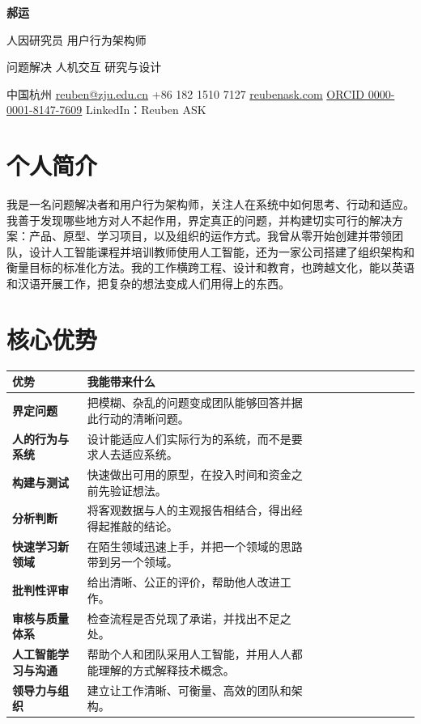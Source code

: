 \documentclass[10pt]{article}
\newcommand{\hd}[1]{\color{white}\bfseries #1}
\newcommand{\rowsep}{\\[3pt] \hline}
\newcommand{\dt}{\textperiodcentered{}}
\begin{document}
{\fontsize{25}{29}\selectfont\bfseries\color{navy} 郝运}\par\vspace{4pt}
{\fontsize{11}{14}\selectfont 人因研究员 \dt{} 用户行为架构师}\par\vspace{3pt}
问题解决 \dt{} 人机交互 \dt{} 研究与设计

中国杭州 \dt{} \href{mailto:reuben@zju.edu.cn}{reuben@zju.edu.cn} \dt{} +86 182 1510 7127\newline
\href{https://reubenask.com}{reubenask.com} \dt{} \href{https://orcid.org/0000-0001-8147-7609}{ORCID 0000-0001-8147-7609} \dt{} LinkedIn：Reuben ASK

\section*{个人简介}
我是一名问题解决者和用户行为架构师，关注人在系统中如何思考、行动和适应。我善于发现哪些地方对人不起作用，界定真正的问题，并构建切实可行的解决方案：产品、原型、学习项目，以及组织的运作方式。我曾从零开始创建并带领团队，设计人工智能课程并培训教师使用人工智能，还为一家公司搭建了组织架构和衡量目标的标准化方法。我的工作横跨工程、设计和教育，也跨越文化，能以英语和汉语开展工作，把复杂的想法变成人们用得上的东西。

\section*{核心优势}
{\fontsize{9.5}{11.5}\selectfont
\begin{longtable}{|P{41mm}|P{132.6mm}|}
\hline{} \hd{优势} & \hd{我能带来什么} \rowsep
{} \textbf{界定问题} & 把模糊、杂乱的问题变成团队能够回答并据此行动的清晰问题。 \rowsep
{} \textbf{人的行为与系统} & 设计能适应人们实际行为的系统，而不是要求人去适应系统。 \rowsep
{} \textbf{构建与测试} & 快速做出可用的原型，在投入时间和资金之前先验证想法。 \rowsep
{} \textbf{分析判断} & 将客观数据与人的主观报告相结合，得出经得起推敲的结论。 \rowsep
{} \textbf{快速学习新领域} & 在陌生领域迅速上手，并把一个领域的思路带到另一个领域。 \rowsep
{} \textbf{批判性评审} & 给出清晰、公正的评价，帮助他人改进工作。 \rowsep
{} \textbf{审核与质量体系} & 检查流程是否兑现了承诺，并找出不足之处。 \rowsep
{} \textbf{人工智能学习与沟通} & 帮助个人和团队采用人工智能，并用人人都能理解的方式解释技术概念。 \rowsep
{} \textbf{领导力与组织} & 建立让工作清晰、可衡量、高效的团队和架构。 \rowsep
\end{longtable}}
\end{document}

